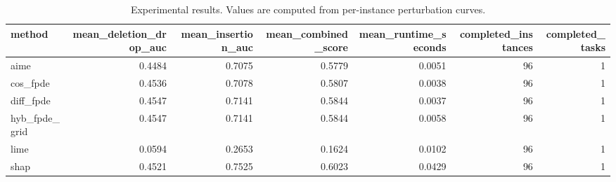 \begin{table}[t]
\caption{Experimental results. Values are computed from per-instance perturbation curves.}
\label{tab:main_results_computed}
\centering
\begin{tabular}{lrrrrrr}
\toprule
method & mean\_deletion\_drop\_auc & mean\_insertion\_auc & mean\_combined\_score & mean\_runtime\_seconds & completed\_instances & completed\_tasks \\
\midrule
aime & 0.4484 & 0.7075 & 0.5779 & 0.0051 & 96 & 1 \\
cos\_fpde & 0.4536 & 0.7078 & 0.5807 & 0.0038 & 96 & 1 \\
diff\_fpde & 0.4547 & 0.7141 & 0.5844 & 0.0037 & 96 & 1 \\
hyb\_fpde\_grid & 0.4547 & 0.7141 & 0.5844 & 0.0058 & 96 & 1 \\
lime & 0.0594 & 0.2653 & 0.1624 & 0.0102 & 96 & 1 \\
shap & 0.4521 & 0.7525 & 0.6023 & 0.0429 & 96 & 1 \\
\bottomrule
\end{tabular}

\end{table}
